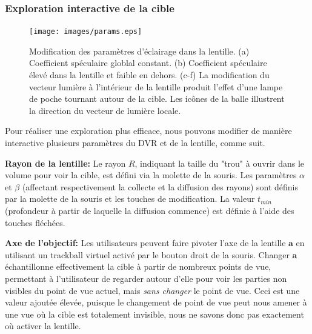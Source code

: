\subsubsection{Exploration interactive de la cible}
\begin{figure}
\centering

\texttt{[image: images/params.eps]}

\caption[Modification des paramètres d'éclairage dans la lentille.]{Modification des paramètres d'éclairage dans la lentille. (a) Coefficient spéculaire globlal constant. (b) Coefficient spéculaire élevé dans la lentille et faible en dehors. (c-f) La modification du vecteur lumière à l'intérieur de la lentille  produit l'effet d'une lampe de poche tournant autour de la cible.  Les icônes de la balle illustrent la direction du vecteur de lumière locale.}
\label{f:paramsfr}

\end{figure}


Pour réaliser une exploration plus efficace, nous pouvons modifier de manière interactive plusieurs paramètres du DVR et de la lentille, comme suit.


\par \textbf{Rayon de la lentille:} Le rayon $ R $, indiquant la taille du "trou" à ouvrir dans le volume pour voir la cible, est défini via la molette de la souris. Les paramètres $ \alpha $ et $ \beta $ (affectant respectivement la collecte et la diffusion des rayons) sont définis par la molette de la souris et les touches de modification. La valeur $ t_{min} $ (profondeur à partir de laquelle la diffusion commence) est définie à l'aide des touches fléchées.

\par \textbf{Axe de l'objectif:} Les utilisateurs peuvent faire pivoter l'axe de la lentille $ \mathbf{a} $ en utilisant un trackball virtuel activé par le bouton droit de la souris. Changer $ \mathbf{a} $ échantillonne effectivement la cible à partir de nombreux points de vue, permettant à l'utilisateur de regarder autour d'elle pour voir les parties non visibles du point de vue actuel, mais \emph{sans changer} le point de vue. Ceci est une valeur ajoutée élevée, puisque le changement de point de vue peut nous amener à une vue où la cible est totalement invisible, nous ne savons donc pas exactement où activer la lentille. 

